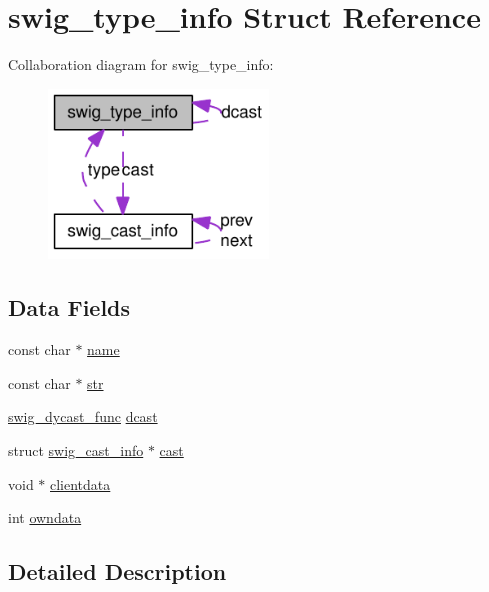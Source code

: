 \hypertarget{structswig__type__info}{
\section{swig\_\-type\_\-info Struct Reference}
\label{structswig__type__info}
}
Collaboration diagram for swig\_\-type\_\-info:\nopagebreak
\begin{figure}[H]
\begin{center}
\leavevmode
\includegraphics[width=166pt]{structswig__type__info__coll__graph}
\end{center}
\end{figure}
\subsection*{Data Fields}
\begin{CompactItemize}
\item 
const char $\ast$ \hyperlink{structswig__type__info_8f8f80d37794cde9472343e4487ba3eb}{name}
\item 
const char $\ast$ \hyperlink{structswig__type__info_f25d6dc49269fa2003ac7c7fa6f13915}{str}
\item 
\hyperlink{_lgm___c_trans__wrap_8c_d9f16e529633c78df7a780b9749395ce}{swig\_\-dycast\_\-func} \hyperlink{structswig__type__info_f97c463eb56e4061bd472750f8f501d3}{dcast}
\item 
struct \hyperlink{structswig__cast__info}{swig\_\-cast\_\-info} $\ast$ \hyperlink{structswig__type__info_ed90935b91e98b8de705d24f1b6facb0}{cast}
\item 
void $\ast$ \hyperlink{structswig__type__info_e60177f52d83fcd32268d79f2aa8012f}{clientdata}
\item 
int \hyperlink{structswig__type__info_25f6d5be66f731f527b185e361b06509}{owndata}
\end{CompactItemize}


\subsection{Detailed Description}


